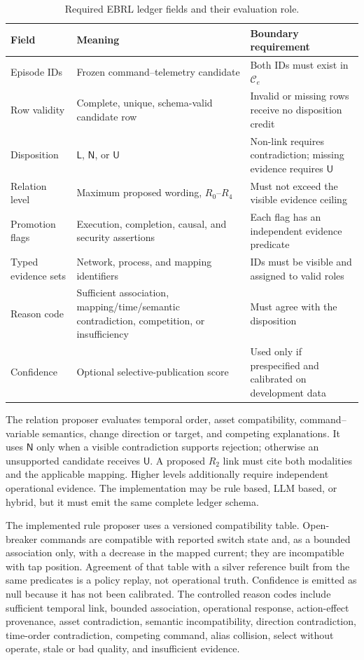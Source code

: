 \documentclass[conference]{IEEEtran}
\begin{document}
\begin{table}[t]
\caption{Required EBRL ledger fields and their evaluation role.}
\label{tab:ledger}
\centering\footnotesize
\begin{tabularx}{\textwidth}{@{}l X X@{}}
\toprule
Field & Meaning & Boundary requirement\\
\midrule
Episode IDs & Frozen command--telemetry candidate & Both IDs must exist in $\mathcal{C}_e$\\
Row validity & Complete, unique, schema-valid candidate row & Invalid or missing rows receive no disposition credit\\
Disposition & $\mathsf{L}$, $\mathsf{N}$, or $\mathsf{U}$ & Non-link requires contradiction; missing evidence requires $\mathsf{U}$\\
Relation level & Maximum proposed wording, $R_0$--$R_4$ & Must not exceed the visible evidence ceiling\\
Promotion flags & Execution, completion, causal, and security assertions & Each flag has an independent evidence predicate\\
Typed evidence sets & Network, process, and mapping identifiers & IDs must be visible and assigned to valid roles\\
Reason code & Sufficient association, mapping/time/semantic contradiction, competition, or insufficiency & Must agree with the disposition\\
Confidence & Optional selective-publication score & Used only if prespecified and calibrated on development data\\
\bottomrule
\end{tabularx}
\end{table}

The relation proposer evaluates temporal order, asset compatibility, command--variable semantics, change direction or target, and competing explanations. It uses $\mathsf{N}$ only when a visible contradiction supports rejection; otherwise an unsupported candidate receives $\mathsf{U}$. A proposed $R_2$ link must cite both modalities and the applicable mapping. Higher levels additionally require independent operational evidence. The implementation may be rule based, LLM based, or hybrid, but it must emit the same complete ledger schema.

The implemented rule proposer uses a versioned compatibility table. Open-breaker commands are compatible with reported switch state and, as a bounded association only, with a decrease in the mapped current; they are incompatible with tap position. Agreement of that table with a silver reference built from the same predicates is a policy replay, not operational truth. Confidence is emitted as null because it has not been calibrated. The controlled reason codes include sufficient temporal link, bounded association, operational response, action-effect provenance, asset contradiction, semantic incompatibility, direction contradiction, time-order contradiction, competing command, alias collision, select without operate, stale or bad quality, and insufficient evidence.
\end{document}
